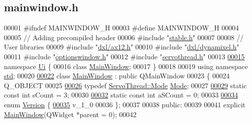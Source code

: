 \hypertarget{a00018_source}{}\subsection{mainwindow.\+h}

\begin{DoxyCode}
00001 \textcolor{preprocessor}{#ifndef MAINWINDOW\_H}
00003 \textcolor{preprocessor}{#define MAINWINDOW\_H}
00004 
00005 \textcolor{comment}{// Adding precompiled header}
00006 \textcolor{preprocessor}{#include "\hyperlink{a00025}{stable.h}"}
00007 
00008 \textcolor{comment}{// User libraries}
00009 \textcolor{preprocessor}{#include "\hyperlink{a00011}{dxl/ax12.h}"}
00010 \textcolor{preprocessor}{#include "\hyperlink{a00015}{dxl/dynamixel.h}"}
00011 \textcolor{preprocessor}{#include "\hyperlink{a00020}{optionswindow.h}"}
00012 \textcolor{preprocessor}{#include "\hyperlink{a00024}{servothread.h}"}
00013 
\hypertarget{a00018_source_l00015}{}\hyperlink{a00027}{00015} \textcolor{keyword}{namespace }\hyperlink{a00027}{Ui} \{
00016 \textcolor{keyword}{class }\hyperlink{a00005}{MainWindow};
00017 \}
00018 
00019 \textcolor{keyword}{using namespace }\hyperlink{a00026}{std};
00020 
\hypertarget{a00018_source_l00022}{}\hyperlink{a00005}{00022} \textcolor{keyword}{class }\hyperlink{a00005}{MainWindow} : \textcolor{keyword}{public} QMainWindow
00023 \{
00024     Q\_OBJECT
00025     
\hypertarget{a00018_source_l00026}{}\hyperlink{a00005_a372482d77430e41c5483ab8605eece9d}{00026}     \textcolor{keyword}{typedef} \hyperlink{a00009_a8d581034e60792a9995d44065f6140a5}{ServoThread::Mode} \hyperlink{a00005_a372482d77430e41c5483ab8605eece9d}{Mode};
00027     
\hypertarget{a00018_source_l00029}{}\hyperlink{a00005_a646727b1c45c72638325adfd460649c0}{00029}     \textcolor{keyword}{static} \textcolor{keyword}{const} \textcolor{keywordtype}{int} sCount = 3;
00030     
\hypertarget{a00018_source_l00032}{}\hyperlink{a00005_a42c44af9c0eebc33f4e81f02e15b0461}{00032}     \textcolor{keyword}{static} \textcolor{keyword}{const} \textcolor{keywordtype}{int} aSCount = 0;
00033     
\hypertarget{a00018_source_l00034}{}\hyperlink{a00005_a355d9f17965e5105226409313743cb9d}{00034}     \textcolor{keyword}{enum} \hyperlink{a00005_a355d9f17965e5105226409313743cb9d}{Version} \{
\hypertarget{a00018_source_l00035}{}\hyperlink{a00005_a355d9f17965e5105226409313743cb9daac0c8ddcec40274ec60fb95f59ba7aba}{00035}         v\_1\_0
00036     \};
00037     
00038 \textcolor{keyword}{public}:
00039     
00041     \textcolor{keyword}{explicit} \hyperlink{a00005}{MainWindow}(QWidget *parent = 0);
00042     

\end{DoxyCode}
